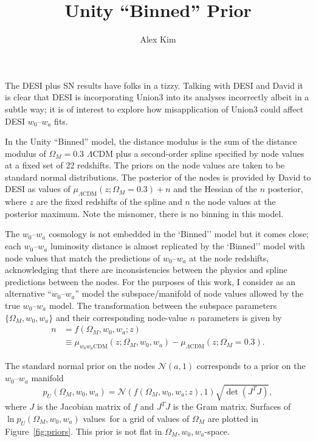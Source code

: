 \documentclass[11pt, oneside]{article}   	%
\title{Unity ``Binned'' Prior}
\author{Alex Kim}
\begin{document}
\maketitle

The DESI plus SN results have folks in a tizzy.  Talking with DESI and David it is clear that DESI is incorporating Union3
into its analyses incorrectly albeit in a subtle way;  it is of interest to explore how misapplication
of Union3 could affect  DESI $w_0$--$w_a$  fits.

In the Unity ``Binned'' model, the distance modulus
is the sum of the distance modulus of $\Omega_M=0.3$  $\Lambda$CDM plus a second-order spline specified by node values
at a fixed set of 22 redshifts.  The priors on the node values are taken to be standard normal distributions\footnotemark[1].  
The posterior of the nodes is provided by David to DESI as values of
$\mu_{\Lambda \text{CDM}}(z;\Omega_M=0.3) + n$ and the Hessian of the $n$ posterior,
where $z$ are the fixed redshifts of the spline and $n$ the node values at the posterior maximum.
Note the misnomer, there is no binning in this model.


The $w_0$--$w_a$ cosmology is not embedded in the `Binned'' model but 
it comes close; each $w_0$--$w_a$ luminosity distance is almost replicated
by the `Binned'' model with node values that match the predictions of $w_0$--$w_a$  at the node redshifts, acknowledging that
there are
inconsistencies between the physics and spline predictions between the nodes.  For the purposes of this work, I consider
as an alternative  ``$w_0$--$w_a$'' model  the subspace/manifold of node values allowed by the true $w_0$--$w_a$
model.  The transformation between the subspace parameters $\{\Omega_M, w_0, w_a\}$ and their corresponding
node-value $n$ parameters is given by
\begin{align}
	n &= f(\Omega_M, w_0, w_a; z) \\
	& \equiv \mu_{w_0 w_a \text{CDM}}(z;\Omega_M, w_0, w_a)  - \mu_{\Lambda \text{CDM}}(z;\Omega_M=0.3).
\end{align}

The standard normal prior on the nodes $\mathcal{N}(a,1)$ corresponds to a prior on the  $w_0$--$w_a$ manifold
\begin{equation}
p_U(\Omega_M, w_0,w_a) = \mathcal{N}(f(\Omega_M, w_0, w_a; z),1)  \sqrt{\det{\left(J^T J\right)}},
\end{equation}
where $J$ is the Jacobian matrix of $f$ and $J^TJ$ is the Gram matrix.
Surfaces of $\ln{p_U}(\Omega_M, w_0,w_a)$ values\ for a grid of values of $\Omega_M$
are plotted in Figure~\ref{fig:priors}.  This prior is not flat in  $\Omega_M, w_0, w_a$-space.
\end{document}
